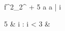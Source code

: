 \begin{eqcode}{f}{}{^{2}_{2}}{^{}}
  \alpha \in {} \lend
  \alpha {} + 5 \lend
  \omega \gets a \lend
   \lend
  a | \forall i \gets
  \begin { cases }
  5 & i : i < 3  & \otherwise \lend
  \end { cases } \lend
\end{eqcode}
